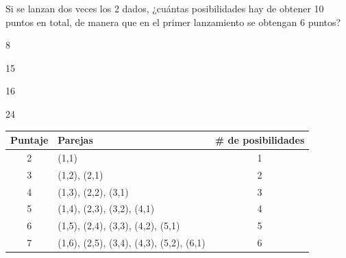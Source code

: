 \documentclass[letterpaper,fleqn]{article}
\begin{document}
\begin{enumerate}
\begin{minipage}{.35\textwidth}
Si se lanzan dos veces los 2 dados, ¿cuántas posibilidades hay de obtener 10 puntos en total, de manera que en el primer lanzamiento se obtengan 6 puntos?
\begin{enumerate}
\begin{multicols}{2}
\item 8
\item 15
\item 16
\item 24
\end{multicols}
\end{enumerate}
 \end{minipage}
 \begin{minipage}{.6\textwidth}
\begin{center}
\begin{tabular}{|c|l|c|}
\hline 
\textbf{Puntaje} & \qquad \textbf{Parejas} & \textbf{\# de posibilidades}\\ \hline
2 & (1,1) & \hspace*{1cm}1 \\ 
\hline 
3 & (1,2), (2,1) & \hspace*{1cm}2 \\ 
\hline 
4 & (1,3), (2,2), (3,1) & \hspace*{1cm}3 \\ 
\hline 
5 & (1,4), (2,3), (3,2), (4,1) & \hspace*{1cm}4 \\ 
\hline 
6 & (1,5), (2,4), (3,3), (4,2), (5,1) & \hspace*{1cm}5 \\ 
\hline 
7 & (1,6), (2,5), (3,4), (4,3), (5,2), (6,1) & \hspace*{1cm}6 \\ 
\hline 
\end{tabular} 
\end{center} 
 \end{minipage}
 \end{enumerate}
\end{document}
